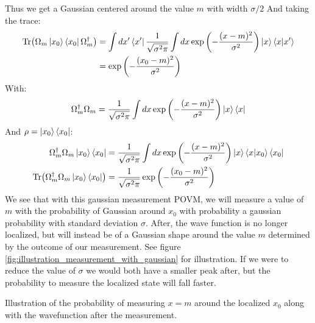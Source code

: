 Thus we get a Gaussian centered around the value $m$ with width $\sigma/2$ 
And taking the trace:
\begin{align*}
    \Tr(\Omega_m \ket{x_0}\bra{x_0} \Omega_m^\dagger) &= \int dx' \bra{x'} \frac{1}{\sqrt{\sigma^2\pi}}\int dx \exp\left(-\frac{(x- m)^2}{\sigma^2}\right)\ket{x}\bra{x} \ket{x'} \\
    &= \exp\left(-\frac{(x_0 - m)^2}{\sigma^2}\right)
\end{align*}
With:
\begin{equation}
    \Omega_m^\dagger\Omega_m =  \frac{1}{\sqrt{\sigma^2\pi}} \int dx \exp\left(-\frac{(x- m)^2}{\sigma^2}\right) \ket{x}\bra{x}
\end{equation}
And $\rho = \ket{x_0}\bra{x_0}$:
\begin{align}
    \Omega_m^\dagger\Omega_m \ket{x_0}\bra{x_0} &= \frac{1}{\sqrt{\sigma^2\pi}} \int dx \exp\left(-\frac{(x- m)^2}{\sigma^2}\right) \ket{x}\bra{x}\ket{x_0}\bra{x_0} \nonumber \\
    \Tr(\Omega_m^\dagger\Omega_m \ket{x_0}\bra{x_0}) &= \frac{1}{\sqrt{\sigma^2\pi}} \exp\left(-\frac{(x_0- m)^2}{\sigma^2}\right)
\end{align}
We see that with this gaussian measurement POVM, we will measure a value of $m$ with the probability of Gaussian around $x_0$ with probability a gaussian probability with standard deviation $\sigma$. After, the wave function is no longer localized, but will instead be of a Gaussian shape around the value $m$ determined by the outcome of our measurement. See figure \ref{fig:illustration_measurement_with_gaussian} for illustration. If we were to reduce the value of $\sigma$ we would both have a smaller peak after, but the probability to measure the localized state will fall faster. 

\begin{marginfigure}[-6 cm]
    \centering
    \caption{Illustration of the probability of measuring $x=m$ around the localized $x_0$ along with the wavefunction after the measurement.}
    \label{fig:illustration_measurement_with_gaussian}
\end{marginfigure}



